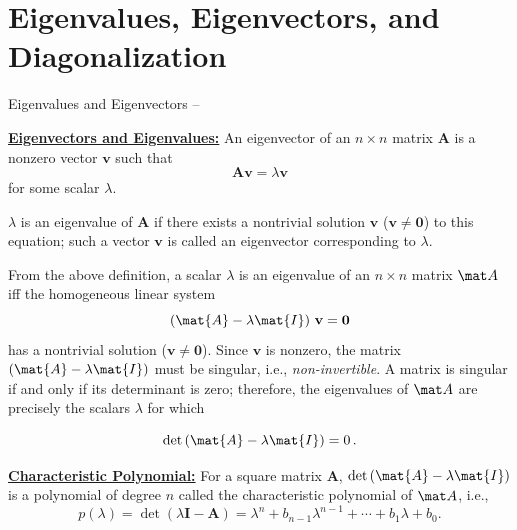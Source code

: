 \section{Eigenvalues, Eigenvectors, and Diagonalization}

\begin{frame}{Eigenvalues and Eigenvectors --}

    \begin{alertblock}{\textbf{\underline{Eigenvectors and Eigenvalues:}}} \medskip
        An \alert{eigenvector} of an $n \times n$ matrix $\mathbf{A}$ is a nonzero vector $\mathbf{v}$ such that
        $$\mathbf{A}\mathbf{v} = \lambda \mathbf{v}$$
        for some scalar $\lambda$.

        \vspace{0.3cm}

        $\lambda$ is an \alert{eigenvalue} of $\mathbf{A}$ if there exists a nontrivial solution $\mathbf{v}$ ($\mathbf{v} \neq \mathbf{0}$) to this equation; such a vector $\mathbf{v}$ is called an \alert{eigenvector corresponding to $\lambda$}.
    \end{alertblock}

    From the above definition, a scalar $\lambda$ is an eigenvalue of an $n \times n$ matrix $\mat A$ iff the homogeneous linear system
    \begin{equation}
        \left(\mat{A} - \lambda \mat{I}\right)\,\mathbf{v} = \mathbf{0}
    \end{equation}
    has a nontrivial solution ($\mathbf{v} \neq \mathbf{0}$). Since $\mathbf{v}$ is nonzero, the matrix $\left(\mat{A} - \lambda \mat{I}\right)$ must be singular, i.e., \emph{non-invertible}. A matrix is singular if and only if its determinant is zero; therefore, the eigenvalues of $\mat A$ are precisely the scalars $\lambda$ for which

    \begin{equation}
        \det\left(\mat{A} - \lambda \mat{I}\right) = 0\,.
    \end{equation}

    \begin{alertblock}{\textbf{\underline{Characteristic Polynomial:}}}\medskip
        For a square matrix $\mathbf{A}$, $\det\left(\mat{A} - \lambda \mat{I}\right)$ is a polynomial of degree $n$ called the \alert{characteristic polynomial} of $\mat A$, i.e.,
        \[
            p(\lambda)
            = \det(\lambda\mathbf{I} - \mathbf{A})
            = \lambda^n + b_{n-1}\lambda^{n-1} + \cdots + b_1\lambda + b_0.
        \]
    \end{alertblock}



\end{frame}

